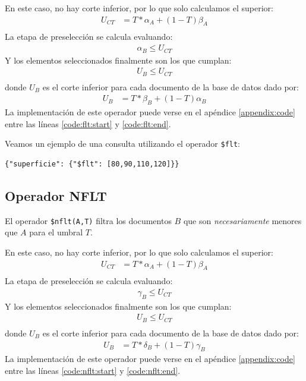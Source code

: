 En este caso, no hay corte inferior, por lo que solo calculamos el superior:
%
\begin{align*}
    U_{CT} &= T * \alpha_A + (1-T)\beta_A \\
\end{align*}
%
La etapa de preselección se calcula evaluando:
%
\begin{align*}
    \alpha_B \leq U_{CT}
\end{align*}
%
Y los elementos seleccionados finalmente son los que cumplan:
%
\begin{align*}
    U_B \leq U_{CT} \\
\end{align*}
%
donde $U_B$ es el corte inferior para cada documento de la base de datos dado por:
%
\begin{align*}
    U_B &= T * \beta_B + (1-T)\alpha_B
\end{align*}
%
La implementación de este operador puede verse en el apéndice \ref{appendix:code} entre las líneas \ref{code:flt:start} y \ref{code:flt:end}.

\begin{example}
Veamos un ejemplo de una consulta utilizando el operador \texttt{\$flt}:
%
\begin{verbatim}
{"superficie": {"$flt": [80,90,110,120]}}
\end{verbatim}

\end{example}

\subsection{Operador NFLT}

El operador \texttt{\$nflt(A,T)} filtra los documentos $B$ que son \textit{necesariamente} menores que $A$ para el umbral $T$.

En este caso, no hay corte inferior, por lo que solo calculamos el superior:
%
\begin{align*}
    U_{CT} &= T * \alpha_A + (1-T)\beta_A \\
\end{align*}
%
La etapa de preselección se calcula evaluando:
%
\begin{align*}
    \gamma_B \leq U_{CT}
\end{align*}
%
Y los elementos seleccionados finalmente son los que cumplan:
%
\begin{align*}
    U_B \leq U_{CT} \\
\end{align*}
%
donde $U_B$ es el corte inferior para cada documento de la base de datos dado por:
%
\begin{align*}
    U_B &= T * \delta_B + (1-T)\gamma_B
\end{align*}
%
La implementación de este operador puede verse en el apéndice \ref{appendix:code} entre las líneas \ref{code:nflt:start} y \ref{code:nflt:end}.

